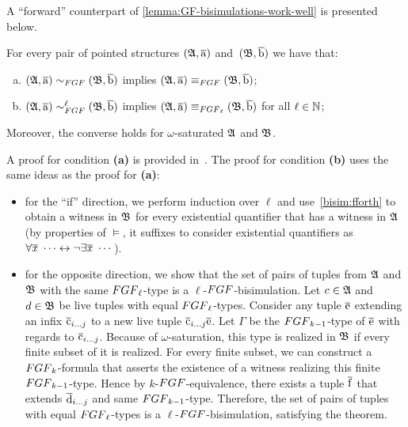 A ``forward'' counterpart of \cref{lemma:GF-bisimulations-work-well} is presented below.
\begin{lemma}\label{lem:FGF-bisimulations-work-well}
For every pair of pointed structures $({\mathfrak{A}}, \overline{\mathrm{a}})$ and~$({\mathfrak{B}}, \overline{\mathrm{b}})$ we have that:
\begin{enumerate}[(a)]
\item $(\str{A}, \elemtuplea) \bisimto_{\FGF} (\str{B}, \elemtupleb)$ implies $(\str{A}, \elemtuplea) \equiv_{\FGF} (\str{B}, \elemtupleb)$;
\item $(\str{A}, \elemtuplea) \bisimto_{\FGF}^{\ell} (\str{B}, \elemtupleb)$ implies $(\str{A}, \elemtuplea) \equiv_{\FGF_\ell} (\str{B}, \elemtupleb)$ for all $\ell \in {\mathbb{N}}$;
\end{enumerate}
Moreover, the converse holds for $\omega$-saturated ${\mathfrak{A}}$ and ${\mathfrak{B}}$.
\end{lemma}
\begin{proofsketch}
  A proof for condition \textbf{(a)} is provided in~\cite[Lemma 3]{BednarczykJ22}.
  The proof for condition \textbf{(b)} uses the same ideas as the proof for \textbf{(a)}:
  \begin{itemize}
    \item
          for the ``if'' direction, we perform induction over $\ell$ and use~\ref{bisim:fforth} to obtain a witness in ${\mathfrak{B}}$ for every existential quantifier that has a witness in ${\mathfrak{A}}$ (by properties of $\models$, it suffixes to consider existential quantifiers as $\forall\overline{\mathit{x}}\ \cdots \leftrightarrow \lnot \exists \overline{\mathit{x}}\ \cdots$).
    \item
          for the opposite direction, we show that the set of pairs of tuples from ${\mathfrak{A}}$ and ${\mathfrak{B}}$ with the same $\FGF_{\ell}$-type is a $\ell$-$\FGF$-bisimulation.
          Let $c \in {\mathfrak{A}}$ and $d \in {\mathfrak{B}}$ be live tuples with equal $\FGF_{\ell}$-types.
          Consider any tuple $\overline{\mathrm{e}}$ extending an infix $\overline{\mathrm{c}}_{i\ldots j}$ to a new live tuple $\overline{\mathrm{c}}_{i\ldots j}\overline{\mathrm{e}}$.
          Let $\Gamma$ be the $\FGF_{k-1}$-type of $\overline{\mathrm{e}}$ with regards to $\overline{\mathrm{c}}_{i\ldots j}$.
          Because of $\omega$-saturation, this type is realized in ${\mathfrak{B}}$ if every finite subset of it is realized.
          For every finite subset, we can construct a $\FGF_{k}$-formula that asserts the existence of a witness realizing this finite $\FGF_{k-1}$-type.
          Hence by $k$-$\FGF$-equivalence, there exists a tuple $\overline{\mathrm{f}}$ that extends $\overline{\mathrm{d}}_{i\ldots j}$ and same $\FGF_{k-1}$-type.
          Therefore, the set of pairs of tuples with equal $\FGF_{\ell}$-types is a $\ell$-$\FGF$-bisimulation, satisfying the theorem.
  \end{itemize}
\end{proofsketch}


